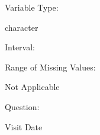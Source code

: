 \documentclass[
]{article}
\begin{document}
\begin{minipage}[t]{0.3\linewidth}

Variable Type:

\end{minipage}%
\begin{minipage}[t]{0.7\linewidth}

character

\end{minipage}

\begin{minipage}[t]{0.3\linewidth}

Interval:

\end{minipage}%
\begin{minipage}[t]{0.7\linewidth}

\end{minipage}

\begin{minipage}[t]{0.3\linewidth}

Range of Missing Values:

\end{minipage}%
\begin{minipage}[t]{0.7\linewidth}

Not Applicable

\end{minipage}

\begin{minipage}[t]{0.3\linewidth}

Question:

\end{minipage}%
\begin{minipage}[t]{0.7\linewidth}

Visit Date

\end{minipage}
\end{document}
